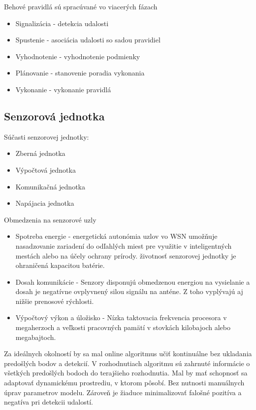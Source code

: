 Behové pravidlá sú spracúvané vo viacerých fázach
\begin{itemize}
\item Signalizácia - detekcia udalosti
\item Spustenie - asociácia udalosti so sadou pravidiel
\item Vyhodnotenie - vyhodnotenie podmienky
\item Plánovanie - stanovenie poradia vykonania
\item Vykonanie - vykonanie pravidlá
\end{itemize}
\cite{processing-information-flows}

\subsection{Senzorová jednotka}

Súčasti senzorovej jednotky:
\begin{itemize}
\item Zberná jednotka
\item Výpočtová jednotka
\item Komunikačná jednotka
\item Napájacia jednotka
\end{itemize}

Obmedzenia na senzorové uzly
\begin{itemize}
\item Spotreba energie - energetická autonómia uzlov vo WSN umožňuje nasadzovanie zariadení do odľahlých miest pre využitie v inteligentných mestách alebo na účely ochrany prírody. životnosť senzorovej jednotky je ohraničená kapacitou batérie.
\item Dosah komunikácie - Senzory disponujú obmedzenou energiou na vysielanie a dosah je negatívne ovplyvnený silou signálu na anténe. Z toho vyplývajú aj nižšie prenosové rýchlosti.
\item Výpočtový výkon a úložisko - Nízka taktovacia frekvencia procesora v megaherzoch a veľkosti pracovných pamätí v stovkách kilobajoch alebo megabajtoch.
\end{itemize}
\cite{big-data-collection-wsn}


Za ideálnych okolností by sa mal online algoritmus učiť kontinuálne bez ukladania predošlých bodov a detekcií.
V rozhodnutiach algoritmu sú zahrnuté informácie o všetkých predošlých bodoch do terajšieho rozhodnutia. Mal by mať schopnosť sa adaptovať dynamickému prostrediu, v ktorom pôsobí. Bez nutnosti manuálnych úprav parametrov modelu. Zároveň je žiaduce minimalizovať falošné pozitíva a negatíva pri detekcii udalostí.


\emptypage

